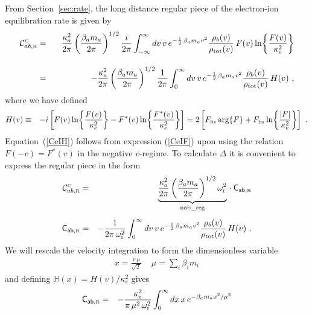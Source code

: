 \documentclass[preprint,12pt,eqsecnum,nofootinbib,amsmath,amssymb]{revtex4}
\newcommand{\smC}{{\rm\scriptscriptstyle C}}
\newcommand{\smI}{{\rm\scriptscriptstyle I}}
\newcommand{\smR}{{\rm\scriptscriptstyle R}}
\newcommand{\smRe}{{\rm\scriptscriptstyle Re}}
\newcommand{\smIm}{{\rm\scriptscriptstyle Im}}
\begin{document}
{{{{{From Section~\ref{sec:rate}, the long distance regular piece of the
electron-ion equilibration rate is given by 
\begin{eqnarray}
  {\cal C}^\smC_{ab,\smR} 
  &=&
  \phantom{-}
  \frac{\kappa_a^2}{2\pi}
  \left(\frac{\beta_a m_a}{2\pi} \right)^{ 1/2} 
  \frac{i}{2 \pi}\int_{-\infty}^{\infty}  dv \, v\, 
  e^{- \frac{1}{2}\,\beta_a m_a  v^2 }  
  \frac{\rho_b(v)}{\rho_\text{tot}(v)} \,  F(v)
  \ln\! \left\{ \frac{F(v)}{\kappa_e^2}\right\} 
\label{CeIF}
\\[10pt]
  &=&
  -\frac{\kappa_a^2}{2\pi}
  \left(\frac{\beta_a m_a}{2\pi} \right)^{ 1/2} 
  \frac{1}{2\pi}\int_0^{\infty}  dv \, v\, 
  e^{- \frac{1}{2}\,\beta_a m_a  v^2 }  
  \frac{\rho_b(v)}{\rho_\text{tot}(v)}\, H(v) \ ,
\label{CeIH}
\end{eqnarray}
where we have defined
\begin{eqnarray}
  H(v) 
  &\equiv&
  -i\left[
  F(v) \ln\!\left\{ \frac{F(v)}{\kappa_e^2}\right\} -
  F^*(v)\ln\!\left\{\frac{F^*(v)}{\kappa_e^2} \right\}\right]
  =
  2\left[
  F_\smRe\, {\rm arg}\{F\}
  +
  F_{\smIm} \ln\!\left\{\frac{\vert F \vert}{\kappa_e^2}\right\}
   \right] \ .
\nonumber\\
\label{Hb}
\end{eqnarray}
Equation~(\ref{CeIH}) follows from expression (\ref{CeIF}) upon using
the relation $F(-v)=F^*(v)$ in the negative $v$-regime.  
To calculate $\Delta$ it is convenient to express the regular piece
in the form
\begin{eqnarray}
  {\cal C}^\smC_{ab,\smR} 
  &=&
  \underbrace{
  \frac{\kappa_a^2}{2\pi}
  \left(\frac{\beta_a m_a}{2\pi} \right)^{ 1/2} 
  \omega_\smI^2 }_\text{nab\_reg}\, \cdot \,  \sf{C}_{ab,\smR}
\\[5pt]
  \sf{C}_{ab,\smR}
  &=&
  -\frac{1}{2\pi\,\omega_\smI^2}\int_0^{\infty}  dv \, v\, 
  e^{- \frac{1}{2}\,\beta_a m_a  v^2 }  
  \frac{\rho_b(v)}{\rho_\text{tot}(v)}\, H(v) \ .
\label{CeIHnew}
\end{eqnarray}
We will rescale the velocity integration to form the dimensionless variable
\begin{eqnarray}
  x = \frac{v \,\mu}{\sqrt{2\,}} ~~~~~ \mu ={\sum}_i \beta_i m_i 
\end{eqnarray}
and defining $\mathbb{H}(x)=H(v)/\kappa_e^2$ gives
\begin{eqnarray}
  \sf{C}_{ab,\smR}
  &=&
  -\frac{\kappa_e^2}{\pi\,\mu^2\,\omega_\smI^2}\int_0^{\infty}  dx \, x\, 
  e^{-\beta_a m_a  x^2/\mu^2 }  

\end{eqnarray}}}}}}
\end{document}
